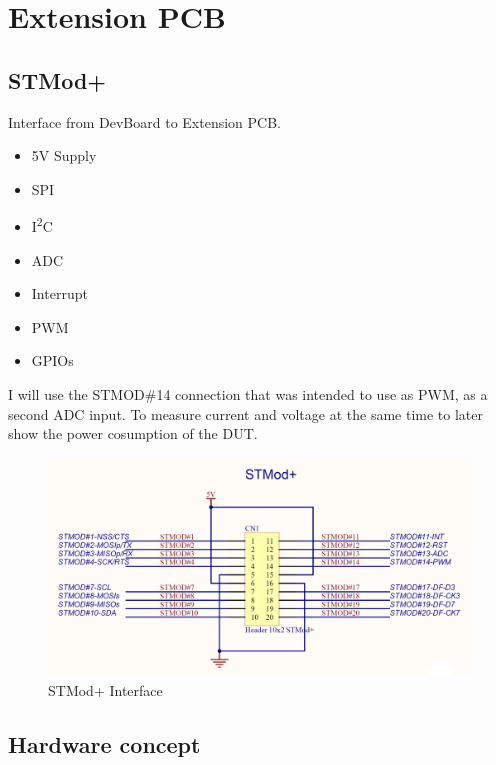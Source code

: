 \newpage


\section{Extension PCB}
\label{sec:Extension PCB}



\subsection{STMod+}
Interface from DevBoard to Extension PCB. 

\begin{itemize}
    \item 5V Supply
    \item SPI 
    \item I\textsuperscript{2}C
    \item ADC
    \item Interrupt
    \item PWM
    \item GPIOs
\end{itemize}

I will use the STMOD\#14 connection that was intended to use as PWM, as a second ADC input. To measure current and voltage at the same time to later show the power cosumption of the DUT.

\begin{figure}[H]
	\centering
	\includegraphics[width=13cm]{Resources/STMOD_Interface.png}
	\caption{STMod+ Interface}
	\label{fig:STMod+ Interface}
\end{figure}




\newpage

\subsection{Hardware concept}

